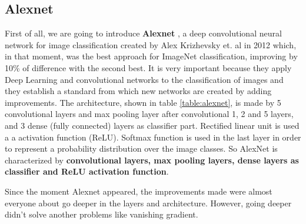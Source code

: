 \subsection{Alexnet}

First of all, we are going to introduce \textbf{Alexnet} \cite{alexnet}, a deep convolutional neural network for image classification created by Alex Krizhevsky et. al in 2012 which, in that moment, was the best approach for ImageNet classification, improving by 10\% of difference with the second best. It is very important because they apply Deep Learning and convolutional networks to the classification of images and they establish a standard from which new networks are created by adding improvements. The architecture, shown in table \ref{table:alexnet}, is made by 5 convolutional layers and max pooling layer after convolutional 1, 2 and 5 layers, and 3 dense (fully connected) layers as classifier part. Rectified linear unit is used a a activation function (ReLU). Softmax function is used in the last layer in order to represent a probability distribution over the image classes. So AlexNet is characterized by \textbf{convolutional layers, max pooling layers, dense layers as classifier and ReLU activation function}.

Since the moment Alexnet appeared, the improvements made were almost everyone about go deeper in the layers and architecture. However, going deeper didn't solve another problems like vanishing gradient.

